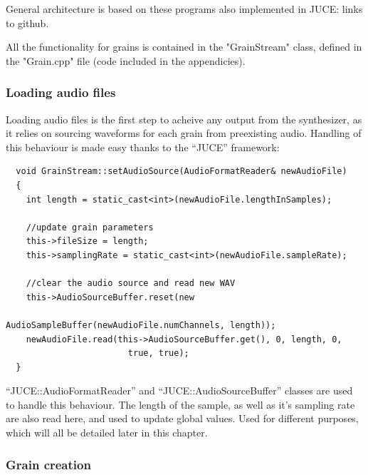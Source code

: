 General architecture is based on these programs also implemented in
JUCE: links to github.

All the functionality for grains is contained in the "GrainStream" class, 
defined in the "Grain.cpp" file (code included in the appendicies).

\subsubsection{Loading audio files}

Loading audio files is the first step to acheive any output from the
synthesizer, as it relies on sourcing waveforms for each grain from
preexisting audio. Handling of this behaviour is made easy thanks to
the ``JUCE'' framework: 
\begin{lstlisting}
  void GrainStream::setAudioSource(AudioFormatReader& newAudioFile)
  {
    int length = static_cast<int>(newAudioFile.lengthInSamples);

    //update grain parameters
    this->fileSize = length;
    this->samplingRate = static_cast<int>(newAudioFile.sampleRate);

    //clear the audio source and read new WAV
    this->AudioSourceBuffer.reset(new
                                     AudioSampleBuffer(newAudioFile.numChannels, length));
    newAudioFile.read(this->AudioSourceBuffer.get(), 0, length, 0,
                        true, true);
  }
\end{lstlisting}

``JUCE::AudioFormatReader'' and ``JUCE::AudioSourceBuffer'' classes
are used to handle this behaviour. The length of the sample, as well
as it's sampling rate are also read here, and used to update global
values. Used for different purposes, which will all be detailed later
in this chapter.

\subsubsection{Grain creation}

